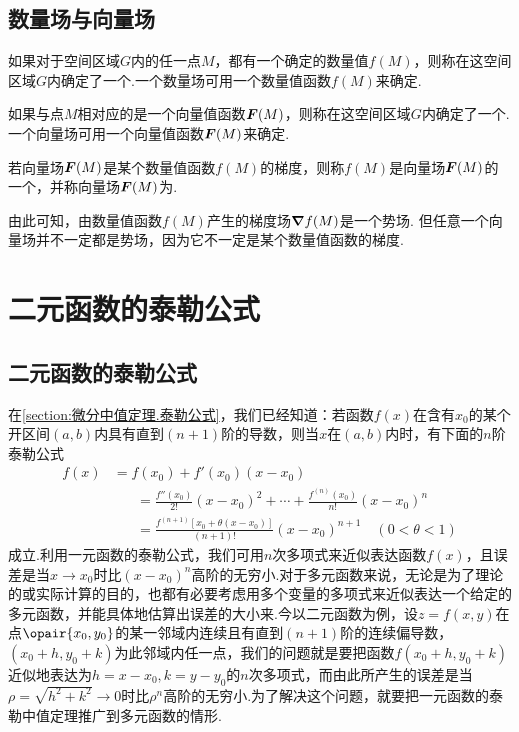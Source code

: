 \subsection{数量场与向量场}
\begin{definition}
如果对于空间区域\(G\)内的任一点\(M\)，都有一个确定的数量值\(f(M)\)，则称在这空间区域\(G\)内确定了一个.一个数量场可用一个数量值函数\(f(M)\)来确定.

如果与点\(M\)相对应的是一个向量值函数\(\boldsymbol{F}(M)\)，则称在这空间区域\(G\)内确定了一个.一个向量场可用一个向量值函数\(\boldsymbol{F}(M)\)来确定.

若向量场\(\boldsymbol{F}(M)\)是某个数量值函数\(f(M)\)的梯度，则称\(f(M)\)是向量场\(\boldsymbol{F}(M)\)的一个，并称向量场\(\boldsymbol{F}(M)\)为.
\end{definition}
由此可知，由数量值函数\(f(M)\)产生的梯度场\(\grad{f}(M)\)是一个势场.
但任意一个向量场并不一定都是势场，因为它不一定是某个数量值函数的梯度.

\section{二元函数的泰勒公式}
\subsection{二元函数的泰勒公式}
在\cref{section:微分中值定理.泰勒公式}，我们已经知道：若函数\(f(x)\)在含有\(x_0\)的某个开区间\((a,b)\)内具有直到\((n+1)\)阶的导数，则当\(x\)在\((a,b)\)内时，有下面的\(n\)阶泰勒公式\begin{align*}
f(x) &= f(x_0) + f'(x_0) (x-x_0) \\
&\hspace{20pt}=\frac{f''(x_0)}{2!} (x-x_0)^2 + \dotsb + \frac{f^{(n)}(x_0)}{n!} (x-x_0)^n \\
&\hspace{20pt}=\frac{f^{(n+1)}[x_0+\theta(x-x_0)]}{(n+1)!} (x-x_0)^{n+1}
\quad(0<\theta<1)
\end{align*}成立.利用一元函数的泰勒公式，我们可用\(n\)次多项式来近似表达函数\(f(x)\)，且误差是当\(x \to x_0\)时比\((x-x_0)^n\)高阶的无穷小.对于多元函数来说，无论是为了理论的或实际计算的目的，也都有必要考虑用多个变量的多项式来近似表达一个给定的多元函数，并能具体地估算出误差的大小来.今以二元函数为例，设\(z=f(x,y)\)在点\(\opair{x_0,y_0}\)的某一邻域内连续且有直到\((n+1)\)阶的连续偏导数，\((x_0+h,y_0+k)\)为此邻域内任一点，我们的问题就是要把函数\(f(x_0+h,y_0+k)\)近似地表达为\(h=x-x_0,k=y-y_0\)的\(n\)次多项式，而由此所产生的误差是当\(\rho=\sqrt{h^2+k^2}\to0\)时比\(\rho^n\)高阶的无穷小.为了解决这个问题，就要把一元函数的泰勒中值定理推广到多元函数的情形.

